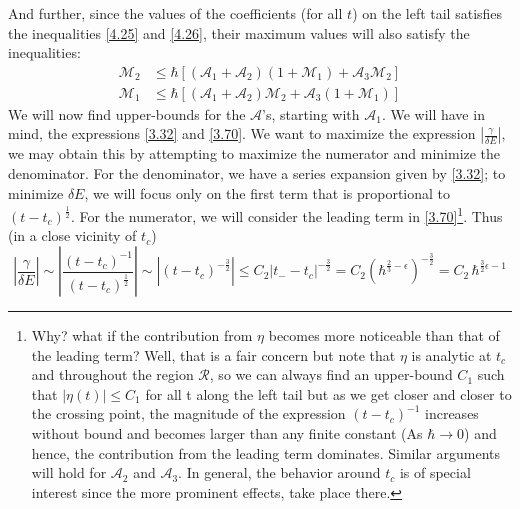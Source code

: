 \documentclass[12pt,a4paper]{article}
\begin{document}
	And further, since the values of the coefficients (for all $t$) on the left tail satisfies the inequalities \eqref{4.25} and \eqref{4.26}, their maximum values will also satisfy the inequalities:
	\begin{align}
		\mathcal{M}_{2} &\leq \hbar \left[ \left( \mathcal{A}_{1} + \mathcal{A}_{2} \right) \left( 1 + \mathcal{M}_{1} \right) + \mathcal{A}_{3}\mathcal{M}_{2} \right] \label{4.27} \\[5pt]
		\mathcal{M}_{1} &\leq \hbar \left[ \left( \mathcal{A}_{1} + \mathcal{A}_{2} \right) \mathcal{M}_{2} + \mathcal{A}_{3}\left( 1 + \mathcal{M}_{1} \right) \right] \label{4.28}
	\end{align}
	We will now find upper-bounds for the $\mathcal{A}$'s, starting with $\mathcal{A}_{1}$. We will have in mind, the expressions \eqref{3.32} and \eqref{3.70}. We want to maximize the expression $\left| \frac{\gamma}{\delta E} \right|$, we may obtain this by attempting to maximize the numerator and minimize the denominator. For the denominator, we have a series expansion given by \eqref{3.32}; to minimize $\delta E$, we will focus only on the first term that is proportional to $\left( t - t_{c} \right)^{\frac{1}{2}}$. For the numerator, we will consider the leading term in \eqref{3.70}\footnote{Why? what if the contribution from $\eta$ becomes more noticeable than that of the leading term? Well, that is a fair concern but note that $\eta$ is analytic at $t_{c}$ and throughout the region $\mathcal{R}$, so we can always find an upper-bound $C_{1}$ such that $\left| \eta(t) \right| \leq C_{1}$ for all t along the left tail but as we get closer and closer to the crossing point, the magnitude of the expression $\left( t - t_{c} \right)^{-1}$ increases without bound and becomes larger than any finite constant (As $\hbar \rightarrow 0$) and hence, the contribution from the leading term dominates. Similar arguments will hold for $\mathcal{A}_{2}$ and $\mathcal{A}_{3}$. In general, the behavior around $t_{c}$ is of special interest since the more prominent effects, take place there.}. Thus (in a close vicinity of $t_{c}$)
	\begin{equation}
		\left| \dfrac{\gamma}{\delta E} \right| \sim \left| \dfrac{\left( t - t_{c} \right)^{-1}}{\left( t - t_{c} \right)^{\frac{1}{2}}} \right| \sim \left| \left( t - t_{c} \right)^{-\frac{3}{2}}\right| \leq C_{2} \left| t_{-} - t_{c} \right|^{-\frac{3}{2}} = C_{2} \left( \hbar^{\frac{2}{3} - \epsilon} \right)^{-\frac{3}{2}} = C_{2}\, \hbar^{\frac{3}{2}\epsilon - 1} \label{4.29}
	\end{equation}
\end{document}
